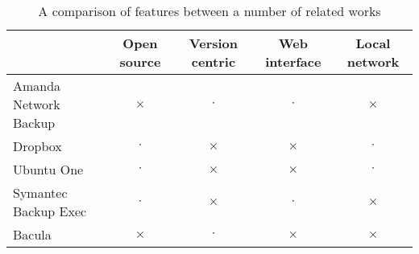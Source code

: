 \begin{table}[H]
    \centering
    \begin{tabular}{ | l | c | c | c | c | }
        \hline
        & Open source   & Version centric   & Web interface & Local network
            \\ \hline

        Amanda Network Backup   & $\times$  & $\cdot$   & $\cdot$   & $\times$
            \\ \hline

        Dropbox                 & $\cdot$   & $\times$  & $\times$  & $\cdot$
            \\ \hline

        Ubuntu One              & $\cdot$   & $\times$  & $\times$  & $\cdot$
            \\ \hline

        Symantec Backup Exec    & $\cdot$   & $\times$  & $\cdot$   & $\times$
            \\ \hline

        Bacula                  & $\times$  & $\cdot$   & $\times$  & $\times$
            \\ \hline
    \end{tabular}
    \caption{A comparison of features between a number of related works}
    \label{tab:feature-comparison}
\end{table}
